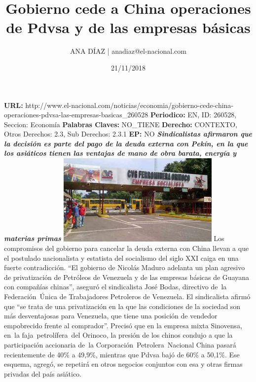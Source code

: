 \documentclass{article}%
\title{\textbf{Gobierno cede a China operaciones de Pdvsa y de las empresas básicas}}%
\author{ANA DÍAZ | anadiaz@el{-}nacional.com}%
\date{21/11/2018}%
\begin{document}
%
\normalsize%
\maketitle%
\textbf{URL: }%
http://www.el{-}nacional.com/noticias/economia/gobierno{-}cede{-}china{-}operaciones{-}pdvsa{-}las{-}empresas{-}basicas\_260528\newline%
%
\textbf{Periodico: }%
EN, %
ID: %
260528, %
Seccion: %
Economía\newline%
%
\textbf{Palabras Claves: }%
NO\_TIENE\newline%
%
\textbf{Derecho: }%
CONTEXTO, %
Otros Derechos: %
2.3, %
Sub Derechos: %
2.3.1\newline%
%
\textbf{EP: }%
NO\newline%
\newline%
%
\textbf{\textit{Sindicalistas afirmaron que la decisión es parte del pago de la deuda externa con Pekín, en la que los asiáticos tienen las ventajas de mano de obra barata, energía y materias primas}}%
\newline%
\newline%
%
\includegraphics[width=300px]{219.jpg}%
\newline%
%
Los compromisos del gobierno para cancelar la deuda externa con China llevan a que el postulado nacionalista y estatista del socialismo del siglo XXI caiga en una fuerte contradicción. “El gobierno de Nicolás Maduro adelanta un plan agresivo de privatización de Petróleos de Venezuela y de las empresas básicas de Guayana con compañías chinas”, aseguró el sindicalista José Bodas, directivo de~la Federación~Única de Trabajadores Petroleros de Venezuela.%
\newline%
%
El sindicalista afirmó que “se trata de una privatización en la que las condiciones de la sociedad son más desventajosas para Venezuela, que tiene una posición de vendedor empobrecido frente al comprador”.%
\newline%
%
Precisó que en la empresa mixta Sinovensa, en~la faja~petrolífera~del Orinoco, la presión de los chinos condujo a que la participación accionaria de~la Corporación~Petrolera~Nacional China pasará recientemente de 40\% a 49,9\%, mientras que Pdvsa bajó de 60\% a 50,1\%. Ese esquema, agregó, se repetirá en otros negocios conjuntos con esa y otras firmas privadas del país asiático.%
\end{document}
